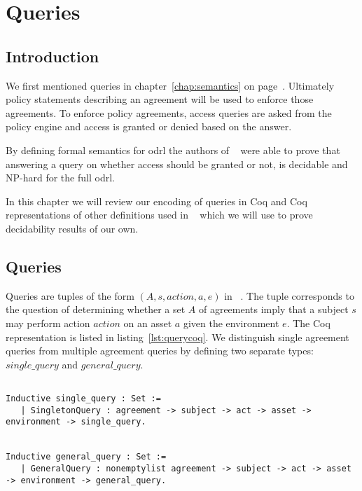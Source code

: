\chapter{Queries}\label{chap:queries}


\section{Introduction}


We first mentioned queries in chapter~\ref{chap:semantics} on page~\pageref{chap:semantics}. Ultimately policy statements describing an agreement will be used to enforce those agreements. To enforce policy agreements, access queries are asked from the policy engine and access is granted or denied based on the answer.

By defining formal semantics for \ac{odrl} the authors of ~\cite{pucella2006} were able to prove that answering a query on whether access should be granted or not, is decidable and NP-hard for the full \ac{odrl}. 

In this chapter we will review our encoding of queries in Coq and Coq representations of other definitions used in ~\cite{pucella2006} which we will use to prove decidability results of our own. 


\section{Queries}

Queries are tuples of the form $(A, s, action, a, e)$ in ~\cite{pucella2006}. The tuple corresponds to the question of determining whether a set $A$ of agreements imply that a subject $s$ may perform action $action$ on an asset $a$ given the environment $e$. The Coq representation is listed in listing~\ref{lst:querycoq}. We distinguish single agreement queries from multiple agreement queries by defining two separate types: $single\_query$ and $general\_query$.

\begin{minipage}[c]{0.95\textwidth}
\begin{lstlisting}

Inductive single_query : Set := 
   | SingletonQuery : agreement -> subject -> act -> asset -> environment -> single_query.
   

Inductive general_query : Set := 
   | GeneralQuery : nonemptylist agreement -> subject -> act -> asset -> environment -> general_query.
\end{lstlisting}
\end{minipage}

